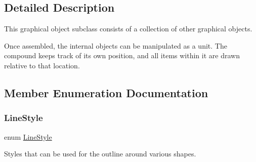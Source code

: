 \subsection{Detailed Description}
This graphical object subclass consists of a collection of other graphical objects. 

Once assembled, the internal objects can be manipulated as a unit. The compound keeps track of its own position, and all items within it are drawn relative to that location. 

\subsection{Member Enumeration Documentation}
\mbox{\label{classGObject_a86e0f5648542856159bb40775c854aa7}} 
\subsubsection{\texorpdfstring{Line\+Style}{LineStyle}}
{\footnotesize\ttfamily enum \mbox{\hyperlink{classGObject_a86e0f5648542856159bb40775c854aa7}{Line\+Style}}\hspace{0.3cm}{\ttfamily [inherited]}}



Styles that can be used for the outline around various shapes. 

